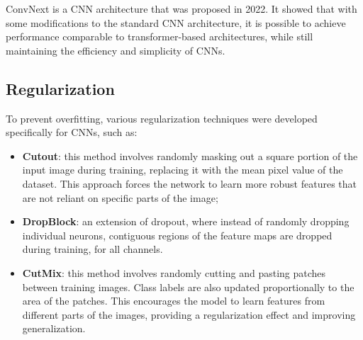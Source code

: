 ConvNext is a CNN architecture that was proposed in 2022. It showed that with some modifications to the standard CNN architecture, it is possible to achieve performance 
comparable to transformer-based architectures, while still maintaining the efficiency and simplicity of CNNs.

\subsection{Regularization}
To prevent overfitting, various regularization techniques were developed specifically for CNNs, such as:
\begin{itemize}
    \item \textbf{Cutout}: this method involves randomly masking out a square portion of the input image during training, replacing it with the mean pixel value of the dataset.
    This approach forces the network to learn more robust features that are not reliant on specific parts of the image;
    \item \textbf{DropBlock}: an extension of dropout, where instead of randomly dropping individual neurons, contiguous regions of the feature maps are dropped during training,
    for all channels.
    \item \textbf{CutMix}: this method involves randomly cutting and pasting patches between training images.
    Class labels are also updated proportionally to the area of the patches. This encourages the model to learn features from different parts of the images,
    providing a regularization effect and improving generalization.
\end{itemize}

